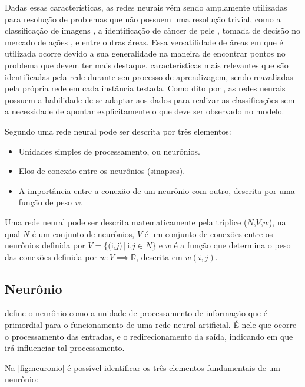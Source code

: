 \par Dadas essas características, as redes neurais vêm sendo amplamente utilizadas para resolução de problemas que não possuem uma resolução trivial, como a classificação de imagens \cite{imaginetArticle}, a identificação de câncer de pele \cite{esteva2017dermatologist}, tomada de decisão no mercado de ações \cite{gambogi2013aplicaccao}, e entre outras áreas. Essa versatilidade de áreas em que é utilizada ocorre devido a sua generalidade na maneira de encontrar pontos no problema que devem ter mais destaque, características mais relevantes que são identificadas pela rede durante seu processo de aprendizagem, sendo reavaliadas pela própria rede em cada instância testada. Como dito por , as redes neurais possuem a habilidade de se adaptar aos dados para realizar as classificações sem a necessidade de apontar explicitamente o que deve ser observado no modelo.
\par Segundo  uma rede neural pode ser descrita por três elementos:
\begin{itemize}
\item Unidades simples de processamento, ou neurônios.
\item Elos de conexão entre os neurônios (sinapses).
\item A importância entre a conexão de um neurônio com outro, descrita por uma função de peso \textit{w}.
\end{itemize}
\par Uma rede neural pode ser descrita matematicamente pela tríplice ($N$,$V$,$w$), na qual $N$ é um conjunto de neurônios, $V$ é um conjunto de conexões entre os neurônios definida por $V = \{($i,$j) \,|\, $i,$j \in N \}$ e $w$ é a função que determina o peso das conexões definida por $w: V \implies \mathbb{R}$, descrita em $w(i,j)$.
\subsection{Neurônio}
 define o neurônio como a unidade de processamento de informação que é primordial para o funcionamento de uma rede neural artificial. É nele que ocorre o processamento das entradas, e o redirecionamento da saída, indicando em que irá influenciar tal processamento.
\par Na \autoref{fig:neuronio} é possível identificar os três elementos fundamentais de um neurônio:


